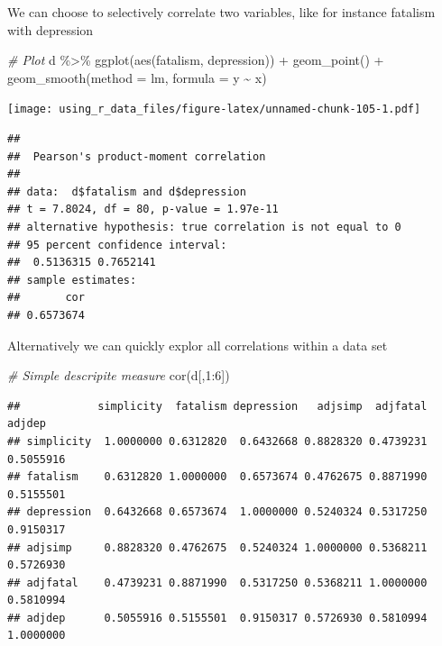 \documentclass[
]{book}
\newenvironment{Shaded}{\begin{snugshade}}{\end{snugshade}}
\newcommand{\AttributeTok}[1]{\textcolor[rgb]{0.77,0.63,0.00}{#1}}
\newcommand{\CommentTok}[1]{\textcolor[rgb]{0.56,0.35,0.01}{\textit{#1}}}
\newcommand{\DecValTok}[1]{\textcolor[rgb]{0.00,0.00,0.81}{#1}}
\newcommand{\FunctionTok}[1]{\textcolor[rgb]{0.00,0.00,0.00}{#1}}
\newcommand{\NormalTok}[1]{#1}
\newcommand{\SpecialCharTok}[1]{\textcolor[rgb]{0.00,0.00,0.00}{#1}}
\newcommand{\StringTok}[1]{\textcolor[rgb]{0.31,0.60,0.02}{#1}}
\begin{document}
We can choose to selectively correlate two variables, like for instance fatalism with depression

\begin{Shaded}
\begin{Highlighting}[]
\CommentTok{\# Plot}
\NormalTok{d }\SpecialCharTok{\%\textgreater{}\%} 
  \FunctionTok{ggplot}\NormalTok{(}\FunctionTok{aes}\NormalTok{(fatalism, depression)) }\SpecialCharTok{+} 
  \FunctionTok{geom\_point}\NormalTok{() }\SpecialCharTok{+}
  \FunctionTok{geom\_smooth}\NormalTok{(}\AttributeTok{method =} \StringTok{\textquotesingle{}lm\textquotesingle{}}\NormalTok{, }\AttributeTok{formula =} \StringTok{\textquotesingle{}y \textasciitilde{} x\textquotesingle{}}\NormalTok{)}
\end{Highlighting}
\end{Shaded}

\texttt{[image: using\_r\_data\_files/figure-latex/unnamed-chunk-105-1.pdf]}

\begin{Shaded}
\end{Shaded}

\begin{verbatim}
## 
##  Pearson's product-moment correlation
## 
## data:  d$fatalism and d$depression
## t = 7.8024, df = 80, p-value = 1.97e-11
## alternative hypothesis: true correlation is not equal to 0
## 95 percent confidence interval:
##  0.5136315 0.7652141
## sample estimates:
##       cor 
## 0.6573674
\end{verbatim}

Alternatively we can quickly explor all correlations within a data set

\begin{Shaded}
\begin{Highlighting}[]
\CommentTok{\# Simple descripite measure}
\FunctionTok{cor}\NormalTok{(d[,}\DecValTok{1}\SpecialCharTok{:}\DecValTok{6}\NormalTok{])}
\end{Highlighting}
\end{Shaded}

\begin{verbatim}
##            simplicity  fatalism depression   adjsimp  adjfatal    adjdep
## simplicity  1.0000000 0.6312820  0.6432668 0.8828320 0.4739231 0.5055916
## fatalism    0.6312820 1.0000000  0.6573674 0.4762675 0.8871990 0.5155501
## depression  0.6432668 0.6573674  1.0000000 0.5240324 0.5317250 0.9150317
## adjsimp     0.8828320 0.4762675  0.5240324 1.0000000 0.5368211 0.5726930
## adjfatal    0.4739231 0.8871990  0.5317250 0.5368211 1.0000000 0.5810994
## adjdep      0.5055916 0.5155501  0.9150317 0.5726930 0.5810994 1.0000000
\end{verbatim}
\end{document}
